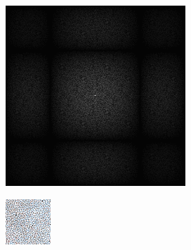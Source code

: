 \begin{figure}[H]
\begin{tcolorbox}[boxrule=4pt,sharp corners=downhill,title=Sortieren]
\begin{subfigure}[b]{0.2\textwidth}
        \includegraphics[width=\textwidth]{content/TemporalerAlg/Bilder/Sorting/Spektren/Ausschnitt1.png}
        \label{pic:sorting_t1_FFT}
    \end{subfigure}
    \begin{subfigure}[b]{0.1\textwidth}
        \hspace*{1cm}
    \end{subfigure}
    \begin{subfigure}[b]{0.2\textwidth}
        \centering
        \includegraphics[width=\textwidth]{content/TemporalerAlg/Bilder/Sorting/Ausschnitte/Ausschnitt5.png}

\end{subfigure}
\end{tcolorbox}
\end{figure}

